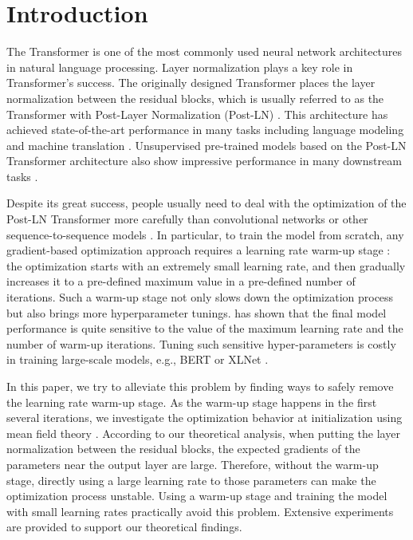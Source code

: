 \documentclass{article}
\begin{document}
\section{Introduction} 
The Transformer \citep{vaswani2017attention} is one of the most commonly used neural network architectures in natural language processing. Layer normalization \citep{lei2016layer} plays a key role in Transformer's success. The originally designed Transformer places the layer normalization between the residual blocks, which is usually referred to as the Transformer with Post-Layer Normalization (Post-LN) \citep{wang2019learning}. This architecture has achieved state-of-the-art performance in many tasks including language modeling \citep{dai2019transformer,al2018character} and machine translation \citep{dehghani2018universal,edunov2018understanding}. Unsupervised pre-trained models based on the Post-LN Transformer architecture also show impressive performance in many downstream tasks \citep{radford2019language,devlin2018bert, yang2019xlnet}. 

Despite its great success, people usually need to deal with the optimization of the Post-LN Transformer more carefully than convolutional networks or other sequence-to-sequence models \citep{popel2018training}. In particular, to train the model from scratch, any gradient-based optimization approach requires a learning rate warm-up stage \citep{vaswani2017attention,liu2019variance}: the optimization starts with an extremely small learning rate, and then gradually increases it to a pre-defined maximum value in a pre-defined number of iterations. Such a warm-up stage not only slows down the optimization process but also brings more hyperparameter tunings. \citet{popel2018training} has shown that the final model performance is quite sensitive to the value of the maximum learning rate and the number of warm-up iterations. Tuning such sensitive hyper-parameters is costly in training large-scale models, e.g., BERT \citep{devlin2018bert} or XLNet \citep{yang2019xlnet}. 

In this paper, we try to alleviate this problem by finding ways to safely remove the learning rate warm-up stage. As the warm-up stage happens in the first several iterations, we investigate the optimization behavior at initialization using mean field theory \citep{lee2017deep,xiao2018dynamical,yang2019mean,yang2019scaling,lee2019wide,zhang2019fixup}. According to our theoretical analysis, when putting the layer normalization between the residual blocks, the expected gradients of the parameters near the output layer are large. Therefore, without the warm-up stage, directly using a large learning rate to those parameters can make the optimization process unstable. Using a warm-up stage and training the model with small learning rates practically avoid this problem. Extensive experiments are provided to support our theoretical findings.
\end{document}
